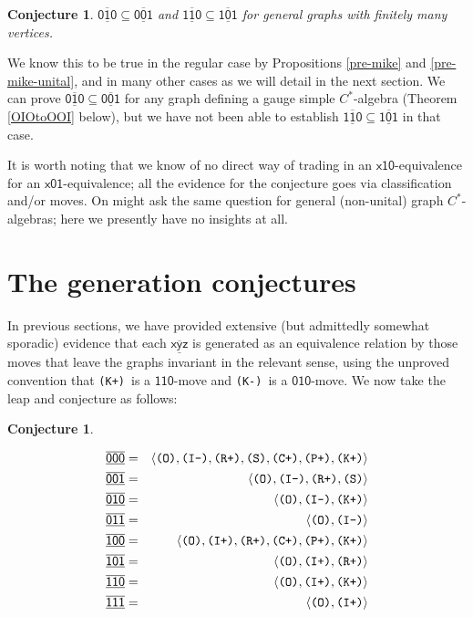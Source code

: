 \documentclass[12pt]{amsbook}%
\newenvironment{discu}{{\sc Discussion:}}{}
\theoremstyle{defin}
\newtheorem{conje}[theor]{Conjecture}
\theoremstyle{remark}
\numberwithin{equation}{chapter}
\numberwithin{theor}{section}
\newcommand{\xyz}[1]{\mbox{$\mathsf{#1}$}}
\newcommand{\xyzrel}[1]{\mbox{$\overline{\underline{\mathsf{ #1}}}$}}
\newcommand{\IIIm}{\mbox{\texttt{\textup{(I-)}}}}
\newcommand{\IIIp}{\mbox{\texttt{\textup{(I+)}}}}
\newcommand{\OOO}{\mbox{\texttt{\textup{(O)}}}}
\newcommand{\CCCp}{\mbox{\texttt{\textup{(C+)}}}}
\newcommand{\RRRp}{\mbox{\texttt{\textup{(R+)}}}}
\newcommand{\PPPp}{\mbox{\texttt{\textup{(P+)}}}}
\newcommand{\KKKp}{\mbox{\texttt{\textup{(K+)}}}}
\newcommand{\KKKm}{\mbox{\texttt{\textup{(K-)}}}}
\newcommand{\SSS}{\mbox{\texttt{\textup{(S)}}}}
\begin{document}
\begin{conje}\label{tradein}
$\xyzrel{010}\subseteq \xyzrel{001}$ and $\xyzrel{110}\subseteq \xyzrel{101}$ for general graphs with finitely many vertices.
\end{conje}
\begin{discu}
We know this to be true in the regular case by Propositions \ref{pre-mike} and \ref{pre-mike-unital}, and in many other cases as we will detail in the next section. We can prove $\xyzrel{010}\subseteq \xyzrel{001}$ for any graph defining a gauge simple $C^*$-algebra (Theorem \ref{OIOtoOOI} below), but we have not been able to establish  $\xyzrel{110}\subseteq \xyzrel{101}$ in that case.

It is worth noting that we know of no direct way of trading in  an \xyz{x10}-equivalence
for  an \xyz{x01}-equivalence; all the evidence for the conjecture goes via classification and/or moves. On might ask the same question for general (non-unital) graph $C^*$-algebras; here we presently have no insights at all.
 \end{discu}
 
\section{The generation conjectures}


In previous sections, we have provided extensive (but admittedly somewhat sporadic) evidence that  
each \xyzrel{xyz} is generated as an equivalence relation by those moves that leave the graphs invariant in the relevant sense, using the unproved convention that \KKKp\ is a \xyz{110}-move and 
\KKKm\ is a \xyz{010}-move. We now take the leap and conjecture as follows:

\begin{conje}\label{master}
\addtocounter{equation}{-1}
\begin{eqnarray}
\xyzrel{000}&=&\langle \OOO,\IIIm,\RRRp,\SSS,\CCCp,\PPPp,\KKKp\rangle\\
\xyzrel{001}&=&\langle \OOO,\IIIm,\RRRp,\SSS\rangle\\
\xyzrel{010}&=&\langle \OOO,\IIIm,\KKKp\rangle\\
\xyzrel{011}&=&\langle \OOO,\IIIm\rangle\\
\xyzrel{100}&=&\langle \OOO,\IIIp,\RRRp,\CCCp,\PPPp,\KKKp\rangle\\
\xyzrel{101}&=&\langle \OOO,\IIIp,\RRRp\rangle\\
\xyzrel{110}&=&\langle \OOO,\IIIp,\KKKp\rangle\\
\xyzrel{111}&=&\langle \OOO,\IIIp\rangle
\end{eqnarray}
\end{conje}
\end{document}
